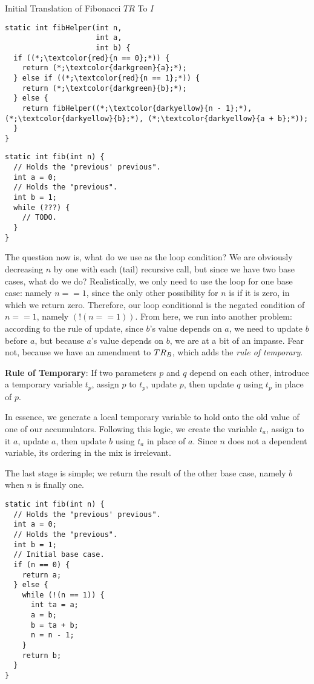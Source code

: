 \begin{clrr}[]{Initial Translation of Fibonacci $TR$ To $I$}
\begin{lstlisting}[language=MyJava]
static int fibHelper(int n, 
                     int a, 
                     int b) {
  if ((*;\textcolor{red}{n == 0};*)) {
    return (*;\textcolor{darkgreen}{a};*);
  } else if ((*;\textcolor{red}{n == 1};*)) {
    return (*;\textcolor{darkgreen}{b};*);
  } else {
    return fibHelper((*;\textcolor{darkyellow}{n - 1};*), (*;\textcolor{darkyellow}{b};*), (*;\textcolor{darkyellow}{a + b};*));
  }
}
\end{lstlisting}
\tcblower
\begin{lstlisting}[language=MyJavaNLN]
static int fib(int n) {
  // Holds the "previous' previous".
  int a = 0;
  // Holds the "previous".
  int b = 1;
  while (???) {
    // TODO.
  }
}
\end{lstlisting}
\end{clrr}

The question now is, what do we use as the  loop condition? We are obviously decreasing $n$ by one with each (tail) recursive call, but since we have two base cases, what do we do? Realistically, we only need to use the loop for one base case: namely $n == 1$, since the only other possibility for $n$ is if it is zero, in which we return zero. Therefore, our loop conditional is the negated condition of $n == 1$, namely $(!(n == 1))$. From here, we run into another problem: according to the rule of update, since $b$'s value depends on $a$, we need to update $b$ before $a$, but because $a$'s value depends on $b$, we are at a bit of an impasse. Fear not, because we have an amendment to $TR_\emph{B}$, which adds the \emph{rule of temporary}.

\textbf{Rule of Temporary}: If two parameters $p$ and $q$ depend on each other, introduce a temporary variable $t_p$, assign $p$ to $t_p$, update $p$, then update $q$ using $t_p$ in place of $p$.

In essence, we generate a local temporary variable to hold onto the old value of one of our accumulators. Following this logic, we create the variable $t_a$, assign to it $a$, update $a$, then update $b$ using $t_a$ in place of $a$. Since $n$ does not a dependent variable, its ordering in the mix is irrelevant.

The last stage is simple; we return the result of the other base case, namely $b$ when $n$ is finally one.

\begin{lstlisting}[language=MyJava]
static int fib(int n) {
  // Holds the "previous' previous".
  int a = 0;
  // Holds the "previous".
  int b = 1;
  // Initial base case.
  if (n == 0) {
    return a;
  } else {
    while (!(n == 1)) {
      int ta = a;
      a = b;
      b = ta + b;
      n = n - 1;
    }
    return b;
  }
}
\end{lstlisting}

